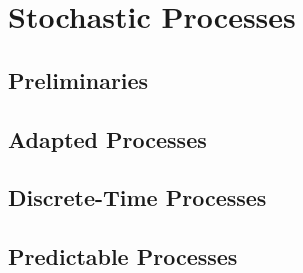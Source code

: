 
\chapter{Stochastic Processes}\label{chapter:stochastic_processes}

\section{Preliminaries}
\section{Adapted Processes}
\section{Discrete-Time Processes}
\section{Predictable Processes}
